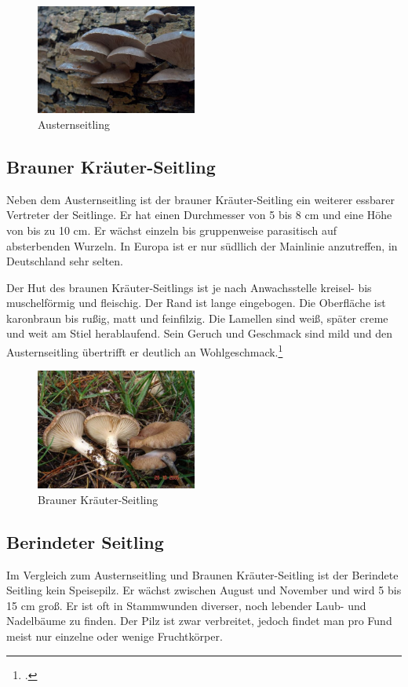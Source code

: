 \documentclass[a4paper,abstracton]{scrreprt}
\begin{document}
\begin{figure}[H]
\centering
\includegraphics[width=200px]{auster2}
\caption[Austernseitling]{Austernseitling\protect\footnotemark}
\label{fig:austernseitling}
\end{figure}

\subsection{Brauner Kräuter-Seitling}
Neben dem Austernseitling ist der brauner Kräuter-Seitling ein weiterer essbarer Vertreter der Seitlinge. Er hat einen Durchmesser von 5 bis 8 cm und eine Höhe von bis zu 10 cm. Er wächst einzeln bis gruppenweise parasitisch auf absterbenden Wurzeln. In Europa ist er nur südllich der Mainlinie anzutreffen, in Deutschland sehr selten.

Der Hut des braunen Kräuter-Seitlings ist je nach Anwachsstelle kreisel- bis muschelförmig und fleischig. Der Rand ist lange eingebogen. Die Oberfläche ist karonbraun bis rußig, matt und feinfilzig. Die Lamellen sind weiß, später creme und weit am Stiel herablaufend. Sein Geruch und Geschmack sind mild und den Austernseitling übertrifft er deutlich an Wohlgeschmack.\footcite{tintling_kraeuter}

\begin{figure}[H]
\centering
\includegraphics[width=200px]{kraeuterseitling}
\caption[Brauner Kräuter-Seitling]{Brauner Kräuter-Seitling\protect\footnotemark}
\label{fig:kraeuterseitling}
\end{figure}

\subsection{Berindeter Seitling}
Im Vergleich zum Austernseitling und Braunen Kräuter-Seitling ist der Berindete Seitling kein Speisepilz. Er wächst zwischen August und November und wird 5 bis 15 cm groß. Er ist oft in Stammwunden diverser, noch lebender Laub- und Nadelbäume zu finden. Der Pilz ist zwar verbreitet, jedoch findet man pro Fund meist nur einzelne oder wenige Fruchtkörper.
\end{document}
